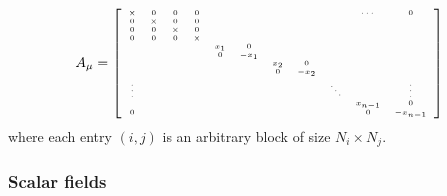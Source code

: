             \begin{equation}
                A_\mu=
                {\tiny
                \left[
                \begin{array}{*{20}c}
                    \times & 0 & 0 & 0 & & & & & & \cdots & 0 \\
                    0 & \times & 0 & 0 & & & & & & & \\
                    0 & 0 & \times & 0 & & & & & & & \\
                    0 & 0 & 0 & \times & & & & & & & \\
                    & & & & x_1 & 0 & & & & & \\
                    & & & & 0 & -x_1 & & & & & \\
                    & & & & & & x_2 & 0 & & & \\
                    & & & & & & 0 & -x_2 & & & \\
                    \vdots & & & & & & & & \ddots & & \vdots \\
                    & & & & & & & & & x_{n-1} & 0 \\
                    0 & & & & & & & & & 0 & -x_{n-1}
            \end{array}
            \right]}\label{eq:invformAmuDn}
            \end{equation}
            where each entry $(i,j)$ is an arbitrary block of size $N_i\times N_j$.

        \subsubsection*{Scalar fields}

